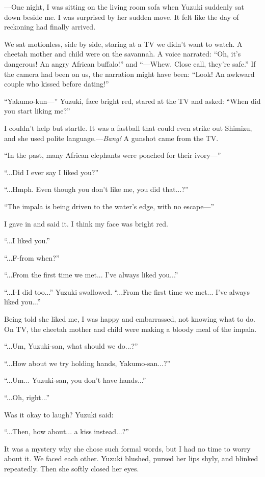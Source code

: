 \documentclass[
    a4paper,
    12pt,
    twoside,
    openany,
    UTF8,
    fontset=windows
]{ctexbook}
\begin{document}
---One night, I was sitting on the living room sofa when Yuzuki suddenly sat down beside me. I was surprised by her sudden move. It felt like the day of reckoning had finally arrived.

We sat motionless, side by side, staring at a TV we didn't want to watch. A cheetah mother and child were on the savannah. A voice narrated: ``Oh, it's dangerous! An angry African buffalo!'' and ``---Whew. Close call, they're safe.'' If the camera had been on us, the narration might have been: ``Look! An awkward couple who kissed before dating!''

``Yakumo-kun---'' Yuzuki, face bright red, stared at the TV and asked: ``When did you start liking me?''

I couldn't help but startle. It was a fastball that could even strike out Shimizu, and she used polite language.---\textit{Bang!} A gunshot came from the TV.

``In the past, many African elephants were poached for their ivory---''

``...Did I ever say I liked you?''

``...Hmph. Even though you don't like me, you did that...?''

``The impala is being driven to the water's edge, with no escape---''

I gave in and said it. I think my face was bright red.

``...I liked you.''

``...F-from when?''

``...From the first time we met... I've always liked you...''

``...I-I did too...'' Yuzuki swallowed. ``...From the first time we met... I've always liked you...''

Being told she liked me, I was happy and embarrassed, not knowing what to do. On TV, the cheetah mother and child were making a bloody meal of the impala.

``...Um, Yuzuki-san, what should we do...?''

``...How about we try holding hands, Yakumo-san...?''

``...Um... Yuzuki-san, you don't have hands...''

``...Oh, right...''

Was it okay to laugh? Yuzuki said:

``...Then, how about... a kiss instead...?''

It was a mystery why she chose such formal words, but I had no time to worry about it. We faced each other. Yuzuki blushed, pursed her lips shyly, and blinked repeatedly. Then she softly closed her eyes.
\end{document}
